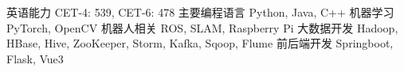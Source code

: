 

\begin{cvskills}
	\cvskill
	{英语能力} %
	{CET-4: 539, CET-6: 478} %
  \cvskill
    {主要编程语言} %
    {Python, Java, C++} %
	\cvskill
	{机器学习} %
	{PyTorch, OpenCV} %
	\cvskill
	{机器人相关} %
	{ROS, SLAM, Raspberry Pi} %
  \cvskill
    {大数据开发} %
    {Hadoop, HBase, Hive, ZooKeeper, Storm, Kafka, Sqoop, Flume} %
	\cvskill
	{前后端开发} %
	{Springboot, Flask, Vue3} %

\end{cvskills}
